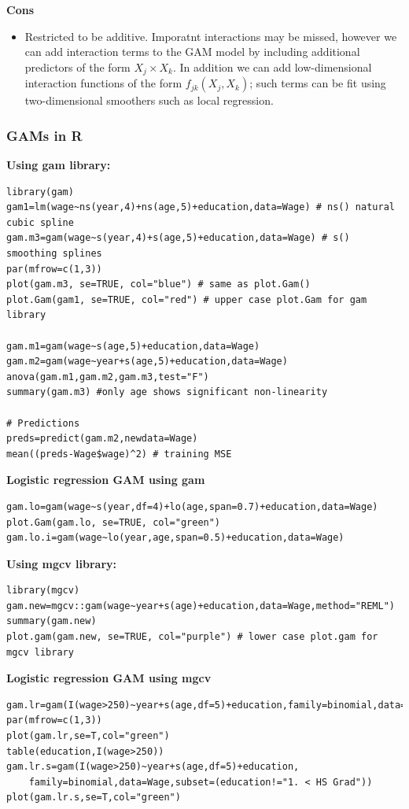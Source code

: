 \documentclass[11pt]{article}
\begin{document}
\noindent \textbf{Cons}
\begin{itemize}
    \item Restricted to be additive. Imporatnt interactions may be missed, however we can add interaction terms to the GAM model by including additional predictors of the form $X_j \times X_k$. In addition we can add low-dimensional interaction functions of the form $f_{jk}(X_j, X_k)$; such terms can be fit using two-dimensional smoothers such as local regression.
\end{itemize}

\subsubsection{GAMs in R}
\noindent \textbf{Using gam library:}
\begin{lstlisting}
library(gam)
gam1=lm(wage~ns(year,4)+ns(age,5)+education,data=Wage) # ns() natural cubic spline
gam.m3=gam(wage~s(year,4)+s(age,5)+education,data=Wage) # s() smoothing splines
par(mfrow=c(1,3))
plot(gam.m3, se=TRUE, col="blue") # same as plot.Gam()
plot.Gam(gam1, se=TRUE, col="red") # upper case plot.Gam for gam library

gam.m1=gam(wage~s(age,5)+education,data=Wage)
gam.m2=gam(wage~year+s(age,5)+education,data=Wage)
anova(gam.m1,gam.m2,gam.m3,test="F")
summary(gam.m3) #only age shows significant non-linearity

# Predictions
preds=predict(gam.m2,newdata=Wage)
mean((preds-Wage$wage)^2) # training MSE
\end{lstlisting}

\noindent \textbf{Logistic regression GAM using gam}
\begin{lstlisting}
gam.lo=gam(wage~s(year,df=4)+lo(age,span=0.7)+education,data=Wage)
plot.Gam(gam.lo, se=TRUE, col="green")
gam.lo.i=gam(wage~lo(year,age,span=0.5)+education,data=Wage)
\end{lstlisting}

\noindent \textbf{Using mgcv library:}
\begin{lstlisting}
library(mgcv)
gam.new=mgcv::gam(wage~year+s(age)+education,data=Wage,method="REML")
summary(gam.new)
plot.gam(gam.new, se=TRUE, col="purple") # lower case plot.gam for mgcv library
\end{lstlisting}

\noindent \textbf{Logistic regression GAM using mgcv}
\begin{lstlisting}
gam.lr=gam(I(wage>250)~year+s(age,df=5)+education,family=binomial,data=Wage)
par(mfrow=c(1,3))
plot(gam.lr,se=T,col="green")
table(education,I(wage>250))
gam.lr.s=gam(I(wage>250)~year+s(age,df=5)+education,
    family=binomial,data=Wage,subset=(education!="1. < HS Grad"))
plot(gam.lr.s,se=T,col="green")
\end{lstlisting}
\end{document}
